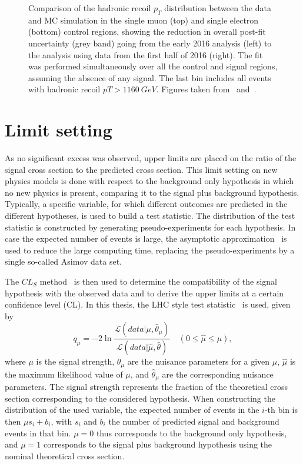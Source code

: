 \begin{figure}[p]
 \caption{Comparison of the hadronic recoil $p_T$ distribution between the data and MC simulation in the single muon (top) and single electron (bottom) control regions, showing the reduction in overall post-fit uncertainty (grey band) going from the early 2016 analysis (left) to the analysis using data from the first half of 2016 (right). The fit was performed simultaneously over all the control and signal regions, assuming the absence of any signal. The last bin includes all events with hadronic recoil $pT > \SI{1160}{GeV}$. Figures taken from~\cite{CMS:2016tns} and~\cite{Sirunyan:2017hci}.}
 \label{fig:comparison2}
\end{figure}

\section{Limit setting}
\label{sec:limits}

As no significant excess was observed, upper limits are placed on the ratio of the signal cross section to the predicted cross section. This limit setting on new physics models is done with respect to the background only hypothesis in which no new physics is present, comparing it to the signal plus background hypothesis. Typically, a specific variable, for which different outcomes are predicted in the different hypotheses, is used to build a test statistic. The distribution of the test statistic is constructed by generating pseudo-experiments for each hypothesis. In case the expected number of events is large, the asymptotic approximation~\cite{Cowan:2010js} is used to reduce the large computing time, replacing the pseudo-experiments by a single so-called Asimov data set.

The $CL_S$ method~\cite{CLS1,CLS2} is then used to determine the compatibility of the signal hypothesis with the observed data and to derive the upper limits at a certain confidence level (CL). In this thesis, the \ac{LHC} style test statistic~\cite{ATLAS:2011tau} is used, given by
\begin{equation}
 q_{\mu} = -2 \ln \frac{\mathcal{L}\left(data|\mu, \hat{\theta}_{\mu} \right)}{\mathcal{L}\left( data|\hat{\mu}, \hat{\theta} \right)} \quad \left(0 \leq \hat{\mu} \leq \mu\right),
\end{equation}
where $\mu$ is the signal strength, $\theta_{\mu}$ are the nuisance parameters for a given $\mu$, $\hat{\mu}$ is the maximum likelihood value of $\mu$, and $\hat{\theta}_{\mu}$ are the corresponding nuisance parameters. The signal strength represents the fraction of the theoretical cross section corresponding to the considered hypothesis. When constructing the distribution of the used variable, the expected number of events in the $i$-th bin is then $\mu s_i + b_i$, with $s_i$ and $b_i$ the number of predicted signal and background events in that bin. $\mu = 0$ thus corresponds to the background only hypothesis, and $\mu = 1$ corresponds to the signal plus background hypothesis using the nominal theoretical cross section.

